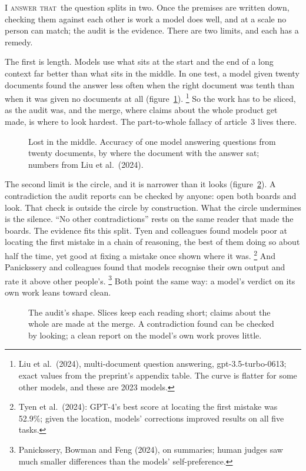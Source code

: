 \documentclass[11pt,a4paper]{article}
\newcounter{art}
\newcommand{\Respondeo}{\par\vspace{1.5mm}\noindent\textsc{I answer that}\ }
\newcommand{\Fig}[3]{%
  \begin{figure}[tbp]\centering #1 \caption{#2}\label{#3}\end{figure}}
\begin{document}
\Respondeo the question splits in two. Once the premises are written down, checking them against each other is work a model does well, and at a scale no person can match; the audit is the evidence. There are two limits, and each has a remedy.

The first is length. Models use what sits at the start and the end of a long context far better than what sits in the middle. In one test, a model given twenty documents found the answer less often when the right document was tenth than when it was given no documents at all (figure~\ref{fig:liu}).%
\footnote{Liu et al.\ (2024), multi-document question answering, gpt-3.5-turbo-0613; exact values from the preprint's appendix table. The curve is flatter for some other models, and these are 2023 models.}
So the work has to be sliced, as the audit was, and the merge, where claims about the whole product get made, is where to look hardest. The part-to-whole fallacy of article~3 lives there.

\Fig{\ChartLiu}{Lost in the middle. Accuracy of one model answering questions from twenty documents, by where the document with the answer sat; numbers from Liu et al.\ (2024).}{fig:liu}

The second limit is the circle, and it is narrower than it looks (figure~\ref{fig:audit}). A contradiction the audit reports can be checked by anyone: open both boards and look. That check is outside the circle by construction. What the circle undermines is the silence. ``No other contradictions'' rests on the same reader that made the boards. The evidence fits this split. Tyen and colleagues found models poor at locating the first mistake in a chain of reasoning, the best of them doing so about half the time, yet good at fixing a mistake once shown where it was.%
\footnote{Tyen et al.\ (2024): GPT-4's best score at locating the first mistake was 52.9\%; given the location, models' corrections improved results on all five tasks.}
And Panickssery and colleagues found that models recognise their own output and rate it above other people's.%
\footnote{Panickssery, Bowman and Feng (2024), on summaries; human judges saw much smaller differences than the models' self-preference.}
Both point the same way: a model's verdict on its own work leans toward clean.

\Fig{\FigAudit}{The audit's shape. Slices keep each reading short; claims about the whole are made at the merge. A contradiction found can be checked by looking; a clean report on the model's own work proves little.}{fig:audit}
\end{document}
